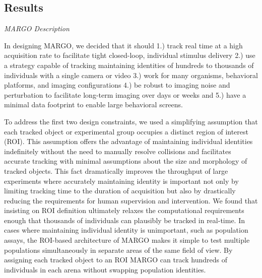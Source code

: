 \documentclass[10pt]{article}
\begin{document}
\begin{multicols}{2}
\section*{Results}

\textit{MARGO Description}

In designing MARGO, we decided that it should 1.) track real time at a high acquisition rate to facilitate tight closed-loop, individual stimulus delivery 2.) use a strategy capable of tracking maintaining identities of hundreds to thousands of individuals with a single camera or video 3.) work for many organisms, behavioral platforms, and imaging configurations 4.) be robust to imaging noise and perturbation to facilitate long-term imaging over days or weeks and 5.) have a minimal data footprint to enable large behavioral screens.

To address the first two design constraints, we used a simplifying assumption that each tracked object or experimental group occupies a distinct region of interest (ROI). This assumption offers the advantage of maintaining individual identities indefinitely without the need to manually resolve collisions and facilitates accurate tracking with minimal assumptions about the size and morphology of tracked objects. This fact dramatically improves the throughput of large experiments where accurately maintaining identity is important not only by limiting tracking time to the duration of acquisition but also by drastically reducing the requirements for human supervision and intervention. We found that insisting on ROI definition ultimately relaxes the computational requirements enough that thousands of individuals can plausibly be tracked in real-time. In cases where maintaining individual identity is unimportant, such as population assays, the ROI-based architecture of MARGO makes it simple to test multiple populations simultaneously in separate areas of the same field of view. By assigning each tracked object to an ROI MARGO can track hundreds of individuals in each arena without swapping population identities.


\end{multicols}
\end{document}
